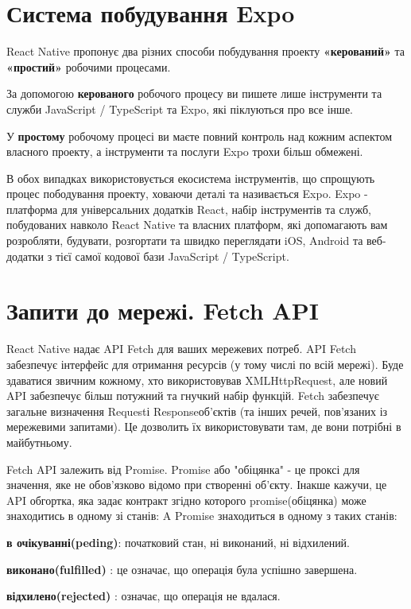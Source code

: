 \section{Система побудування Expo}
\label{section.2.4}
React Native пропонує два різних способи побудування проекту \textbf{«керований»} та \textbf{«простий»} робочими процесами.
\begin{itemize}
    \begin{item}
        За допомогою \textbf{керованого} робочого процесу ви пишете лише інструменти та служби JavaScript / TypeScript та Expo, які піклуються про все інше.
    \end{item}
    \begin{item}
        У \textbf{простому} робочому процесі ви маєте повний контроль над кожним аспектом власного проекту, а інструменти та послуги Expo трохи більш обмежені.
    \end{item}
\end{itemize}

В обох випадках використовується екосистема інструментів, що спрощують процес пободування проекту, ховаючи деталі та називається Expo.
Expo - платформа для універсальних додатків React, набір інструментів та служб, побудованих навколо React Native та власних платформ, які допомагають вам розробляти, будувати, розгортати та швидко переглядати iOS, Android та веб-додатки з тієї самої кодової бази JavaScript / TypeScript.\cite{expo_doc}


\section{Запити до мережі. Fetch API}
\label{section.2.5}
React Native надає API Fetch для ваших мережевих потреб.
API Fetch забезпечує інтерфейс для отримання ресурсів (у тому числі по всій мережі).
Буде здаватися звичним кожному, хто використовував XMLHttpRequest, але новий API забезпечує більш потужний та гнучкий набір функцій.
Fetch забезпечує загальне визначення Requestі Responseоб'єктів (та інших речей, пов'язаних із мережевими запитами).
Це дозволить їх використовувати там, де вони потрібні в майбутньому.

Fetch API залежить від Promise.
Promise або "обіцянка" - це проксі для значення, яке не обов'язково відомо при створенні об'єкту.\cite{promise_doc}
Інакше кажучи, це API обгортка, яка задає контракт згідно которого promise(обіцянка) може знаходитись в одному зі станів:
A Promise знаходиться в одному з таких станів:
\begin{itemize}
    \begin{item}
        \textbf{в очікуванні(peding)}: початковий стан, ні виконаний, ні відхилений.
    \end{item}
    \begin{item}
        \textbf{виконано(fulfilled)} : це означає, що операція була успішно завершена.
    \end{item}
    \begin{item}
        \textbf{відхилено(rejected)} : означає, що операція не вдалася.
    \end{item}
\end{itemize}

